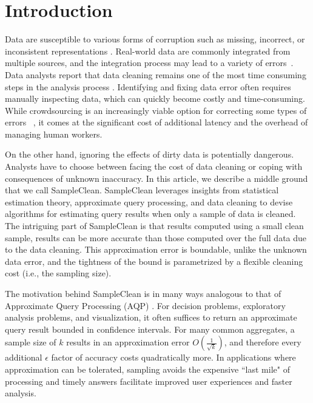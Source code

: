 \section{Introduction}
Data are susceptible to various forms of corruption such as missing,
incorrect, or inconsistent representations \cite{Gartner}.
Real-world data are commonly integrated from multiple sources, and the integration process may lead to a variety of errors~\cite{DBLP:journals/pvldb/DongS13}. 
Data analysts report that data cleaning remains one of the most time
consuming steps in the analysis process \cite{nytimes}.
Identifying and fixing data error often requires manually inspecting data, which can quickly become costly and time-consuming. 
While crowdsourcing is an increasingly viable option for correcting some types of errors ~\cite{DBLP:conf/sigmod/JefferyFH08,DBLP:journals/pvldb/FanLMTY10,DBLP:journals/pvldb/YakoutENOI11, gokhale2014corleone, park2014crowdfill, sampleclean,chu2015katara}, it comes at the significant cost of additional latency and the overhead of managing human workers. 

On the other hand, ignoring the effects of dirty data is potentially dangerous.
Analysts have to choose between facing the cost of data cleaning
or coping with consequences of unknown inaccuracy.
In this article, we describe a middle ground that we call SampleClean.
SampleClean leverages insights from statistical estimation theory, approximate query processing, and data cleaning to devise algorithms for estimating query results when
only a sample of data is cleaned.
The intriguing part of SampleClean is that results computed using a small clean sample,                                   
results can be more accurate than those computed over the full data due to the data cleaning.
This approximation error is boundable, unlike the unknown data error, and the tightness of the bound is parametrized by a flexible cleaning cost (i.e., the sampling size).

The motivation behind SampleClean is in many ways analogous to that of Approximate Query Processing (AQP) \cite{DBLP:conf/icde/OlkenR92, olken1993random, garofalakis2001approximate, DBLP:conf/eurosys/AgarwalMPMMS13}.
For decision problems, exploratory analysis problems, and visualization, it often suffices to return an approximate query result bounded in confidence intervals.
For many common aggregates, a sample size of $k$ results in an approximation error $O(\frac{1}{\sqrt{k}})$, and therefore every additional $\epsilon$ factor of accuracy costs quadratically more. 
In applications where approximation can be tolerated, sampling avoids the expensive ``last mile" of processing and timely answers facilitate improved user experiences and faster analysis.

